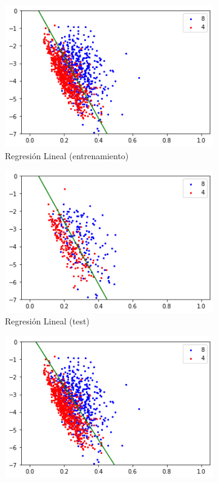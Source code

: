 \documentclass[10pt,a4paper]{article}
\begin{document}
\begin{figure}
	\begin{subfigure}{0.5\textwidth}
		\centering
		\includegraphics[width=\textwidth]{bonus_reglin_train}
		\caption{Regresión Lineal (entrenamiento)}
	\end{subfigure}
	\begin{subfigure}{0.5\textwidth}
		\centering
		\includegraphics[width=\textwidth]{bonus_reglin_test}
		\caption{Regresión Lineal (test)}
	\end{subfigure}
	\begin{subfigure}{0.5\textwidth}
		\centering
		\includegraphics[width=\textwidth]{bonus_pocket_train}

\end{subfigure}
\end{figure}
\end{document}
